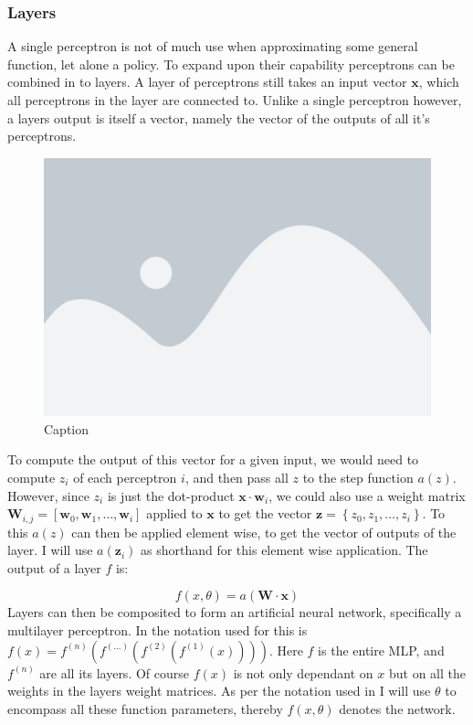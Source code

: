 \subsubsection{Layers}\label{subsubsec:nn:comp:layers}
A single perceptron is not of much use when approximating some general function, let alone a policy. To expand upon their capability perceptrons can be combined in to layers. A layer of perceptrons still takes an input vector $\mathbf{x}$, which all perceptrons in the layer are connected to. Unlike a single perceptron however, a layers output is itself a vector, namely the vector of the outputs of all it's perceptrons.

\begin{figure}[H]
    \centering
    \includegraphics[width=0.6\linewidth]{figures/placeholder.png}
    \caption{Caption}
    \label{fig:my_label_1}
\end{figure}
\noindent
To compute the output of this vector for a given input, we would need to compute $z_i$ of each perceptron $i$, and then pass all $z$ to the step function $a(z)$. However, since $z_i$ is just the dot-product $\mathbf{x} \cdot \mathbf{w}_i$, we could also use a weight matrix $\mathbf{W}_{i, j} = \left[ \mathbf{w}_0, \mathbf{w}_1, \dots, \mathbf{w}_i \right]$ applied to $\mathbf{x}$ to get the vector $\mathbf{z} = \left\{ z_0, z_1, \dots, z_i \right\}$. To this $a(z)$ can then be applied element wise, to get the vector of outputs of the layer. I will use $a(\mathbf{z}_i)$ as shorthand for this element wise application. The output of a layer $f$ is:

\begin{equation}
    f(x, \theta) = a \left( \mathbf{W} \cdot \mathbf{x} \right)
\end{equation}
\noindent
Layers can then be composited to form an artificial neural network, specifically a multilayer perceptron. In \cite[p. 164]{Goodfellow-et-al-2016} the notation used for this is $f(x) = f^{(n)}(f^{(\dots)}(f^{(2)}(f^{(1)}(x))))$. Here $f$ is the entire MLP, and $f^{(n)}$ are all its layers. Of course $f(x)$ is not only dependant on $x$ but on all the weights in the layers weight matrices. As per the notation used in \cite{Goodfellow-et-al-2016} I will use $\theta$ to encompass all these function parameters, thereby $f(x, \theta)$ denotes the network. 

